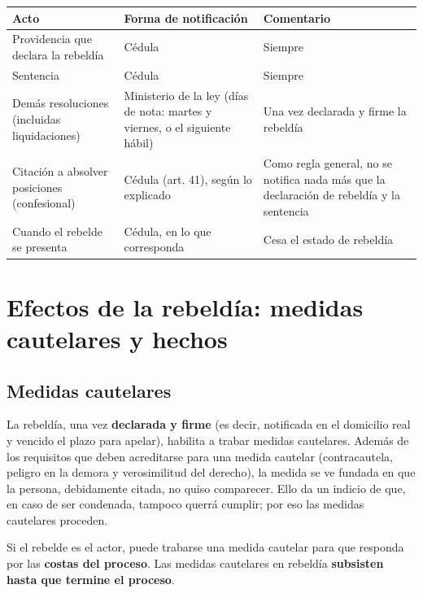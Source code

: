 \documentclass[12pt,oneside]{book}
\begin{document}
\begin{table}[H]
\centering
\renewcommand{\arraystretch}{1.3}
\begin{tabularx}{\textwidth}{
    >{\raggedright\arraybackslash}p{}
    >{\raggedright\arraybackslash}X
    >{\raggedright\arraybackslash}X
}
\toprule
\textbf{Acto} & \textbf{Forma de notificaci\'on} & \textbf{Comentario} \\
\midrule
Providencia que declara la rebeld\'ia & C\'edula & Siempre \\
Sentencia & C\'edula & Siempre \\
Dem\'as resoluciones (incluidas liquidaciones) & Ministerio de la ley (d\'ias de nota: martes y viernes, o el siguiente h\'abil) & Una vez declarada y firme la rebeld\'ia \\
Citaci\'on a absolver posiciones (confesional) & C\'edula (art. 41), seg\'un lo explicado & Como regla general, no se notifica nada m\'as que la declaraci\'on de rebeld\'ia y la sentencia \\
Cuando el rebelde se presenta & C\'edula, en lo que corresponda & Cesa el estado de rebeld\'ia \\
\bottomrule
\end{tabularx}
\end{table}

\section{Efectos de la rebeld\'ia: medidas cautelares y hechos}

\subsection{Medidas cautelares}

La rebeld\'ia, una vez \textbf{declarada y firme} (es decir, notificada en el domicilio real y vencido el plazo para apelar), habilita a trabar medidas cautelares. Adem\'as de los requisitos que deben acreditarse para una medida cautelar (contracautela, peligro en la demora y verosimilitud del derecho), la medida se ve fundada en que la persona, debidamente citada, no quiso comparecer. Ello da un indicio de que, en caso de ser condenada, tampoco querr\'a cumplir; por eso las medidas cautelares proceden.

Si el rebelde es el actor, puede trabarse una medida cautelar para que responda por las \textbf{costas del proceso}. Las medidas cautelares en rebeld\'ia \textbf{subsisten hasta que termine el proceso}.
\end{document}
